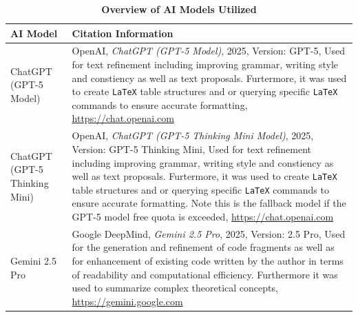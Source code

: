\documentclass[12pt,a4paper]{article}
\begin{document}
\captionsetup{list=no} %
\begin{table}[H]
	\centering
	\begin{threeparttable}
		\caption{\textbf{Overview of AI Models Utilized}}
		\label{list_of_ai_tools}
		\small
		\begin{tabular}{p{4cm} p{12cm}}
			\toprule
			\textbf{AI Model}             & \textbf{Citation Information}                                                                                                                                                                                                                                                                                                                                                                                                      \\
			\midrule
			ChatGPT (GPT-5 Model)         &
			OpenAI, \textit{ChatGPT (GPT-5 Model)}, 2025, Version: GPT-5, Used for text refinement including improving grammar, writing style and constiency as well as text proposals. Furtermore, it was used to create \texttt{LaTeX} table structures and or querying specific \texttt{LaTeX} commands to ensure accurate formatting, \url{https://chat.openai.com}                                                                                                        \\

			ChatGPT (GPT-5 Thinking Mini) &
			OpenAI, \textit{ChatGPT (GPT-5 Thinking Mini Model)}, 2025, Version: GPT-5 Thinking Mini, Used for text refinement including improving grammar, writing style and constiency as well as text proposals. Furtermore, it was used to create \texttt{LaTeX} table structures and or querying specific \texttt{LaTeX} commands to ensure accurate formatting. Note this is the fallback model if the GPT-5 model free quota is exceeded, \url{https://chat.openai.com} \\

			Gemini 2.5 Pro                &
			Google DeepMind, \textit{Gemini 2.5 Pro}, 2025, Version: 2.5 Pro, Used for the generation and refinement of code fragments as well as for enhancement of existing code written by the author in terms of readability and computational efficiency. Furthermore it was used to summarize complex theoretical concepts, \url{https://gemini.google.com}                                                                                                              \\


\end{tabular}
\end{threeparttable}
\end{table}
\end{document}
